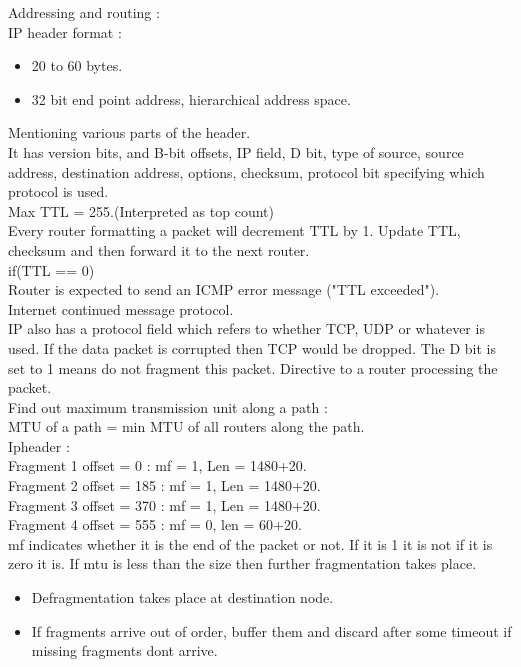 \documentclass[solution,addpoints,12pt]{exam}
\begin{document}
Addressing and routing :\\
IP header format :
\begin{itemize}
\item 20 to 60 bytes.
\item 32 bit end point address, hierarchical address space.
\end{itemize}
Mentioning various parts of the header.\\
It has version bits, and B-bit offsets, IP field, D bit,
type of source, source address, destination address, options, checksum,
protocol bit specifying which protocol is used.\\

Max TTL = 255.(Interpreted as top count)\\
Every router formatting a packet will decrement TTL by 1.
Update TTL, checksum and then forward it to the next router.\\
if(TTL == 0)\\
Router is expected to send an ICMP error message ("TTL exceeded").\\
Internet continued message protocol.\\

IP also has a protocol field which refers to whether TCP, UDP
or whatever is used. If the data packet is corrupted then TCP
would be dropped. The D bit is set to 1 means do not fragment this
packet. Directive to a router processing the packet.\\

Find out maximum transmission unit along a path :\\
MTU of a path = min MTU of all routers along the path.\\

Ipheader :\\
Fragment 1 offset = 0 : mf = 1, Len = 1480+20.\\
Fragment 2 offset = 185 : mf = 1, Len = 1480+20.\\
Fragment 3 offset = 370 : mf = 1, Len = 1480+20.\\
Fragment 4 offset = 555 : mf = 0, len = 60+20.\\
mf indicates whether it is the end of the packet or not. If it is 1
it is not if it is zero it is.
If mtu is less than the size then further fragmentation
takes place. \\
\begin{itemize}
\item Defragmentation takes place at destination node.
\item If fragments arrive out of order, buffer them and
discard after some timeout if missing fragments dont arrive.
\end{itemize}
\end{document}

